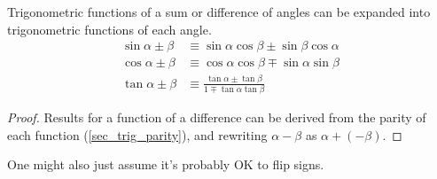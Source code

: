 \begin{theorem} \label{thm_trig_compound}
 Trigonometric functions of a sum or difference of angles can be expanded into
 trigonometric functions of each angle.
 \begin{align*}
  \sin \alpha \pm \beta &\equiv
     \sin \alpha \cos \beta \pm \sin \beta \cos \alpha \\
  \cos \alpha \pm \beta &\equiv
     \cos \alpha \cos \beta \mp \sin \alpha \sin \beta \\
  \tan \alpha \pm \beta &\equiv
      \frac{\tan \alpha \pm \tan \beta}{1 \mp \tan \alpha \tan \beta}
 \end{align*}
\end{theorem}
\begin{proof}
 Results for a function of a difference can be derived from the parity of
 each function (\ref{sec_trig_parity}), and rewriting \(\alpha - \beta\) as
 \(\alpha + (-\beta)\).
\end{proof}
One might also just assume it's probably OK to flip signs.

